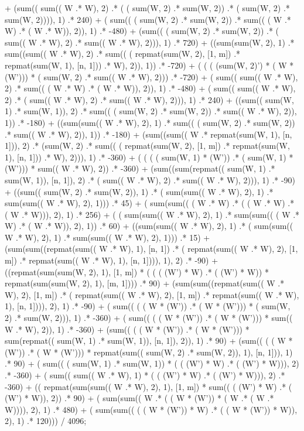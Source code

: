 \documentclass{article}
\begin{document}
  + (sum(( sum(( W .* W), 2) .* ( ( sum(W, 2) .* sum(W, 2)) .* ( sum(W, 2) .* sum(W, 2)))), 1)  .* 240) 
  + ( sum(( ( sum(W, 2) .* sum(W, 2)) .* sum(( ( W .* W) .* ( W .* W)), 2)), 1) .* -480) 
  + (sum(( ( sum(W, 2) .* sum(W, 2)) .* ( sum(( W .* W), 2) .* sum(( W .* W), 2))), 1)  .* 720) 
  + ((sum(sum(W, 2), 1)  .* sum((sum(( W .* W), 2)  .* sum(( ( repmat(sum(W, 2), [1, m]) .* repmat(sum(W, 1), [n, 1])) .* W), 2)), 1))  .* -720) 
  + ( ( ( (sum(W, 2)') * ( W * (W'))) * ( sum(W, 2) .* sum(( W .* W), 2))) .* -720) 
  + ( sum(( sum(( W .* W), 2) .* sum(( ( W .* W) .* ( W .* W)), 2)), 1) .* -480) 
  + ( sum(( sum(( W .* W), 2) .* ( sum(( W .* W), 2) .* sum(( W .* W), 2))), 1) .* 240) 
  + ((sum(( sum(W, 1) .* sum(W, 1)), 2)  .* sum(( ( sum(W, 2) .* sum(W, 2)) .* sum(( W .* W), 2)), 1))  .* -180) 
  + ((sum(sum(( W .* W), 2), 1)  .* sum(( ( sum(W, 2) .* sum(W, 2)) .* sum(( W .* W), 2)), 1))  .* -180) 
  + (sum((sum(( W .* repmat(sum(W, 1), [n, 1])), 2)  .* (sum(W, 2)  .* sum(( ( repmat(sum(W, 2), [1, m]) .* repmat(sum(W, 1), [n, 1])) .* W), 2))), 1)  .* -360) 
  + ( ( ( ( sum(W, 1) * (W')) .* ( sum(W, 1) * (W'))) * sum(( W .* W), 2)) .* -360) 
  + (sum((sum(repmat(( sum(W, 1) .* sum(W, 1)), [n, 1]), 2)  .* ( sum(( W .* W), 2) .* sum(( W .* W), 2))), 1)  .* -90) 
  + ((sum(( sum(W, 2) .* sum(W, 2)), 1)  .* ( sum(sum(( W .* W), 2), 1) .* sum(sum(( W .* W), 2), 1)))  .* 45) 
  + ( sum(sum(( ( W .* W) .* ( ( W .* W) .* ( W .* W))), 2), 1) .* 256) 
  + ( ( sum(sum(( W .* W), 2), 1) .* sum(sum(( ( W .* W) .* ( W .* W)), 2), 1)) .* 60) 
  + ((sum(sum(( W .* W), 2), 1)  .* ( sum(sum(( W .* W), 2), 1) .* sum(sum(( W .* W), 2), 1)))  .* 15) 
  + (sum(sum((repmat(sum(( W .* W), 1), [n, 1])  .* ( repmat(sum(( W .* W), 2), [1, m]) .* repmat(sum(( W .* W), 1), [n, 1]))), 1), 2)  .* -90) 
  + ((repmat(sum(sum(W, 2), 1), [1, m])  * ( ( ( (W') * W) .* ( (W') * W)) * repmat(sum(sum(W, 2), 1), [m, 1])))  .* 90) 
  + (sum(sum((repmat(sum(( W .* W), 2), [1, m])  .* ( repmat(sum(( W .* W), 2), [1, m]) .* repmat(sum(( W .* W), 1), [n, 1]))), 2), 1)  .* -90) 
  + ( sum(( ( ( W * (W')) .* ( W * (W'))) * ( sum(W, 2) .* sum(W, 2))), 1) .* -360) 
  + ( sum(( ( ( W * (W')) .* ( W * (W'))) * sum(( W .* W), 2)), 1) .* -360) 
  + (sum(( ( ( W * (W')) .* ( W * (W'))) * sum(repmat(( sum(W, 1) .* sum(W, 1)), [n, 1]), 2)), 1)  .* 90) 
  + (sum(( ( ( W * (W')) .* ( W * (W'))) * repmat(sum(( sum(W, 2) .* sum(W, 2)), 1), [n, 1])), 1)  .* 90) 
  + ( sum(( ( sum(W, 1) .* sum(W, 1)) * ( ( (W') * W) .* ( (W') * W))), 2) .* -360) 
  + ( sum(( sum(( W .* W), 1) * ( ( (W') * W) .* ( (W') * W))), 2) .* -360) 
  + (( repmat(sum(sum(( W .* W), 2), 1), [1, m]) * sum(( ( (W') * W) .* ( (W') * W)), 2))  .* 90) 
  + ( sum(sum(( W .* ( ( W * (W')) * ( W .* ( W .* W)))), 2), 1) .* 480)  + ( sum(sum(( ( ( W * (W')) * W) .* ( ( W * (W')) * W)), 2), 1) .* 120))) / 4096;
\end{document}
